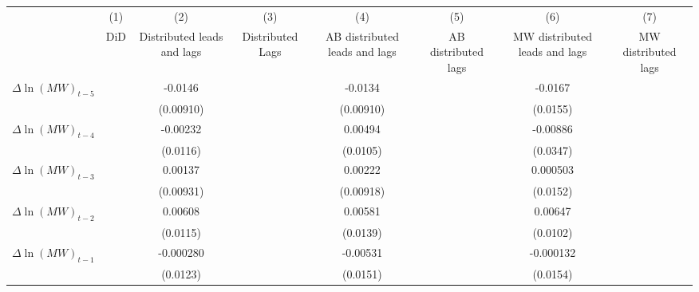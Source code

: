 {
\def\sym#1{\ifmmode^{#1}\else\(^{#1}\)\fi}
\begin{tabular}{l*{7}{c}}
\hline\hline
          &\multicolumn{1}{c}{(1)}&\multicolumn{1}{c}{(2)}&\multicolumn{1}{c}{(3)}&\multicolumn{1}{c}{(4)}&\multicolumn{1}{c}{(5)}&\multicolumn{1}{c}{(6)}&\multicolumn{1}{c}{(7)}\\
          &\multicolumn{1}{c}{DiD}&\multicolumn{1}{c}{Distributed leads and lags}&\multicolumn{1}{c}{Distributed Lags}&\multicolumn{1}{c}{AB distributed leads and lags}&\multicolumn{1}{c}{AB distributed lags}&\multicolumn{1}{c}{MW distributed leads and lags}&\multicolumn{1}{c}{MW distributed lags}\\
\hline
$\Delta \ln(MW)_{t-5}$&                  &  -0.0146         &                  &  -0.0134         &                  &  -0.0167         &                  \\
          &                  &(0.00910)         &                  &(0.00910)         &                  & (0.0155)         &                  \\
[1em]
$\Delta \ln(MW)_{t-4}$&                  & -0.00232         &                  &  0.00494         &                  & -0.00886         &                  \\
          &                  & (0.0116)         &                  & (0.0105)         &                  & (0.0347)         &                  \\
[1em]
$\Delta \ln(MW)_{t-3}$&                  &  0.00137         &                  &  0.00222         &                  & 0.000503         &                  \\
          &                  &(0.00931)         &                  &(0.00918)         &                  & (0.0152)         &                  \\
[1em]
$\Delta \ln(MW)_{t-2}$&                  &  0.00608         &                  &  0.00581         &                  &  0.00647         &                  \\
          &                  & (0.0115)         &                  & (0.0139)         &                  & (0.0102)         &                  \\
[1em]
$\Delta \ln(MW)_{t-1}$&                  &-0.000280         &                  & -0.00531         &                  &-0.000132         &                  \\
          &                  & (0.0123)         &                  & (0.0151)         &                  & (0.0154)         &                  \\

\end{tabular}}
